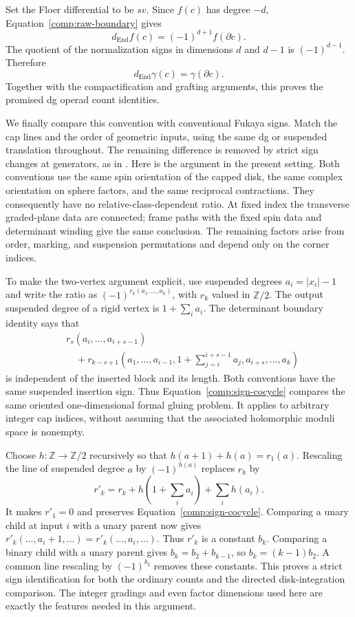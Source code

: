 \documentclass[11pt]{article}
\numberwithin{equation}{section}
\theoremstyle{definition}
\theoremstyle{remark}
\newcommand{\Z}{\mathbb Z}
\begin{document}
Set the Floer differential to be $s v$.  Since $f(c)$ has degree
$-d$, Equation~\eqref{comp:raw-boundary} gives
\[
 d_{\mathrm{End}}f(c)=(-1)^{d+1}f(\partial c).
\]
The quotient of the normalization signs in dimensions $d$ and
$d-1$ is $(-1)^{d-1}$.  Therefore
\begin{equation}
 d_{\mathrm{End}}\gamma(c)=\gamma(\partial c).
 \label{comp:dg-count}
\end{equation}
Together with the compactification and grafting arguments, this
proves the promised dg operad count identities.

We finally compare this convention with conventional Fukaya
signs.  Match the cap lines and the order of geometric inputs,
using the same dg or suspended translation throughout.  The
remaining difference is removed by strict sign changes at
generators, as in \cite[Lemma~7.7]{A8}.  Here is the argument in the
present setting.  Both conventions use the same spin orientation
of the capped disk, the same complex orientation on sphere
factors, and the same reciprocal contractions.  They consequently
have no relative-class-dependent ratio.  At fixed index the
transverse graded-plane data are connected; frame paths with the
fixed spin data and determinant winding give the same conclusion.
The remaining factors arise from order, marking, and suspension
permutations and depend only on the corner indices.

To make the two-vertex argument explicit, use suspended degrees
$a_i=|x_i|-1$ and write the ratio as
$(-1)^{r_k(a_1,\ldots,a_k)}$, with $r_k$ valued in $\Z/2$.
The output suspended degree of a rigid vertex is
$1+\sum_i a_i$.  The determinant boundary identity says that
\begin{equation}
 \begin{split}
 &r_s(a_i,\ldots,a_{i+s-1})\\
 &\quad+r_{k-s+1}\left(a_1,\ldots,a_{i-1},
     1+\sum_{j=i}^{i+s-1}a_j,a_{i+s},\ldots,a_k\right)
 \end{split}
 \label{comp:sign-cocycle}
\end{equation}
is independent of the inserted block and its length.  Both
conventions have the same suspended insertion sign.  Thus
Equation~\eqref{comp:sign-cocycle} compares the same oriented
one-dimensional formal gluing problem.  It applies to arbitrary
integer cap indices, without assuming that the associated
holomorphic moduli space is nonempty.

Choose $h:\Z\to\Z/2$ recursively so that
$h(a+1)+h(a)=r_1(a)$.  Rescaling the line of suspended degree $a$
by $(-1)^{h(a)}$ replaces $r_k$ by
\[
 r'_k=r_k+h\left(1+\sum_i a_i\right)+\sum_i h(a_i).
\]
It makes $r'_1=0$ and preserves
Equation~\eqref{comp:sign-cocycle}.  Comparing a unary child at
input $i$ with a unary parent now gives
$r'_k(\ldots,a_i+1,\ldots)=r'_k(\ldots,a_i,\ldots)$.
Thus $r'_k$ is a constant $b_k$.  Comparing a binary child with a
unary parent gives $b_k=b_2+b_{k-1}$, so $b_k=(k-1)b_2$.
A common line rescaling by $(-1)^{b_2}$ removes these constants.
This proves a strict sign identification for both the ordinary
counts and the directed disk-integration comparison.  The
integer gradings and even factor dimensions used here are exactly
the features needed in this argument.
\end{document}
